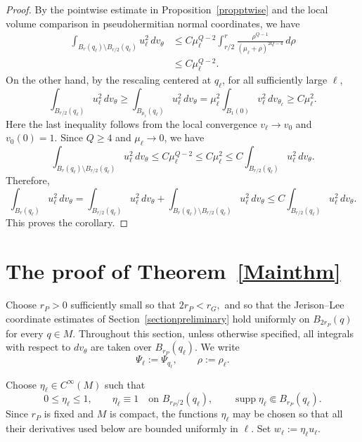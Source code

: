 \documentclass[11pt]{article}
\numberwithin{equation}{section}
\numberwithin{equation}{section}
\begin{document}
	\begin{proof}
		By the pointwise estimate in Proposition~\ref{propptwise} and the local volume comparison in pseudohermitian normal coordinates, we have
		\[
		\begin{aligned}
			\int_{B_{r}(q_\ell)\setminus B_{r/2}(q_\ell)}u_\ell^2\,dv_\theta &\le C\mu_\ell^{Q-2} \int_{r/2}^{r} \frac{\rho^{Q-1}}{(\mu_\ell+\rho)^{2Q-4}}\,d\rho  \\
			&\le C\mu_\ell^{Q-2}.
		\end{aligned}
		\]
		On the other hand, by the rescaling centered at \(q_\ell\), for all sufficiently large \(\ell\),
		\[
		\int_{B_{r/2}(q_\ell)}u_\ell^2\,dv_\theta \ge \int_{B_{\mu_\ell}(q_\ell)}u_\ell^2\,dv_\theta = \mu_\ell^2 \int_{B_1(0)}v_\ell^2\,dv_{\theta_\ell} \ge C\mu_\ell^2 .
		\]
		Here the last inequality follows from the local convergence \(v_\ell\to v_0\) and \(v_0(0)=1\). Since \(Q\ge4\) and \(\mu_\ell\to0\), we have
		\[
		\int_{B_{r}(q_\ell)\setminus B_{r/2}(q_\ell)}u_\ell^2\,dv_\theta \le C\mu_\ell^{Q-2} \le C\mu_\ell^2 \le C\int_{B_{r/2}(q_\ell)}u_\ell^2\,dv_\theta .
		\]
		Therefore,
		\[
		\int_{B_{r}(q_\ell)}u_\ell^2\,dv_\theta = \int_{B_{r/2}(q_\ell)}u_\ell^2\,dv_\theta + \int_{B_{r}(q_\ell)\setminus B_{r/2}(q_\ell)}u_\ell^2\,dv_\theta \le C\int_{B_{r/2}(q_\ell)}u_\ell^2\,dv_\theta .
		\]
		This proves the corollary.
	\end{proof}
	
	
	\section{The proof of Theorem~\ref{Mainthm}}\label{sectionpohozaev}

Choose \(r_P>0\) sufficiently small so that
\(
2r_P<r_G,
\)
and so that the Jerison--Lee coordinate estimates of
Section~\ref{sectionpreliminary} hold uniformly on \(B_{2r_P}(q)\) for
every \(q\in M\).  Throughout this section, unless otherwise specified, all
integrals with respect to \(dv_\theta\) are taken over
\(B_{r_P}(q_\ell)\).  We write
\[
\Psi_\ell:=\Psi_{q_\ell},
\qquad
\rho:=\rho_\ell.
\]

Choose \(\eta_\ell\in C^\infty(M)\) such that
\[
0\le\eta_\ell\le1,
\qquad
\eta_\ell\equiv1
\quad\text{on }B_{r_P/2}(q_\ell),
\qquad
\operatorname{supp}\eta_\ell\Subset B_{r_P}(q_\ell).
\]
Since \(r_P\) is fixed and \(M\) is compact, the functions \(\eta_\ell\)
may be chosen so that all their derivatives used below are bounded uniformly
in \(\ell\).  Set
\(
w_\ell:=\eta_\ell u_\ell.
\)
\end{document}
